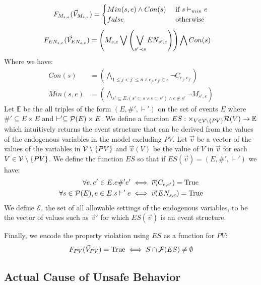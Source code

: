 $$
    F_{M_{s,e}}(\vec V_{M_{s,e}}) = \begin{cases}
        Min(s,e) \wedge Con(s) & \text{ if } s \vdash_{min} e \\
        false                  & \text{ otherwise }
    \end{cases}
$$
\begin{align*}
    F_{EN_{s,e}}(\vec V_{EN_{s,e}}) & =
    \left(
    M_{s,e} \bigvee
    \left(
    \bigvee_{s'\prec s}EN_{s',e}
    \right)
    \right)
    \bigwedge
    Con(s)
\end{align*}
Where we have:
\begin{align*}
    Con(s)   & =   \left(
    \bigwedge_{ 1\leq j<j' \leq n \wedge e_j,e_{j'} \in s}
    \neg C_{e_j,e_{j'}}
    \right)               \\
    Min(s,e) & = \left(
    \bigwedge_{s' \subseteq E. (s' \subset s \vee s \subset s')
        \wedge e \notin s'}
    \neg M_{s',e}
    \right)
\end{align*}
Let $\mathbb{E}$ be the all triples of the form
$(E,\#',\vdash')$ on the set of events $E$ where
$\#' \subseteq E \times E$ and
$\vdash' \subseteq \mathcal{P}(E) \times E$.
We define a function
$ES: \times_{V \in \mathcal{V}\setminus \{PV\}} \mathcal{R}(V) \rightarrow \mathbb{E}$ which intuitively returns the event structure
that can be derived from the values of the endogenous variables
in the model excluding $PV$.
Let $\vec v$ be a vector of the values of the variables
in $\mathcal{V} \setminus \{PV\}$ and $\vec v(V)$ be the value of
 $V$ in $\vec v$ for each $V \in \mathcal{V} \setminus \{PV\}$.
We define the function $ES$ so that if
$ES(\vec v) = (E,\#',\vdash')$ we have:
\begin{align*}
    \forall e,e' \in E. e \#' e' & \iff \vec{v}(C_{e,e'}) = \mathrm{True} \\
    \forall s \in \mathcal{P}(E), e \in E.  s \vdash' e
     & \iff \vec{v}(EN_{s,e}) = \mathrm{True}
\end{align*}
We define $\mathcal{E}$, the set of all allowable
settings of the endogenous variables, to be the vector of
values such as $\vec v'$ for which $ES(\vec v)$ is an
event structure.

Finally, we encode the property violation using $ES$ as a function for $PV$:
\begin{align*}
    F_{PV}(\vec V_{PV})  = \mathrm{True} \iff S \cap \mathcal{F}(ES) \neq \emptyset
\end{align*}

\subsection{Actual Cause of Unsafe Behavior}

